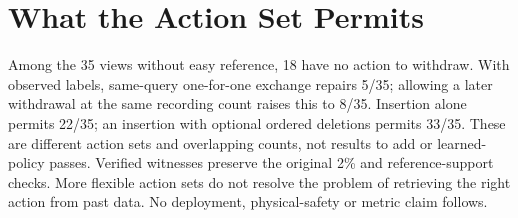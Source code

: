 \documentclass[10pt,onecolumn,letterpaper]{article}
\begin{document}
\section{What the Action Set Permits}

Among the 35 views without easy reference, 18 have no action to withdraw. With observed labels, same-query one-for-one exchange repairs 5/35; allowing a later withdrawal at the same recording count raises this to 8/35. Insertion alone permits 22/35; an insertion with optional ordered deletions permits 33/35. These are different action sets and overlapping counts, not results to add or learned-policy passes. Verified witnesses preserve the original 2\% and reference-support checks. More flexible action sets do not resolve the problem of retrieving the right action from past data. No deployment, physical-safety or metric claim follows.
\end{document}

